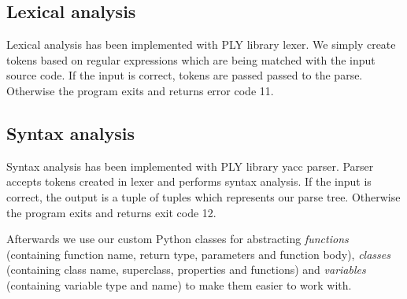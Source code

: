 \documentclass[12pt]{article}
\begin{document}
\subsection{Lexical analysis}
Lexical analysis has been implemented with PLY library lexer. We simply create tokens based on regular expressions which are being matched with the input source code. If the input is correct, tokens are passed passed to the parse. Otherwise the program exits and returns error code 11. 

\subsection{Syntax analysis}
Syntax analysis has been implemented with PLY library yacc parser.
Parser accepts tokens created in lexer and performs syntax analysis.
If the input is correct, the output is a tuple of tuples which represents our parse tree. Otherwise the program exits and returns exit code 12.

Afterwards we use our custom Python classes for abstracting \emph{functions} (containing function name, return type, parameters and function body), \emph{classes} (containing class name, superclass, properties and functions) and \emph{variables} (containing variable type and name) to make them easier to work with.
\end{document}
